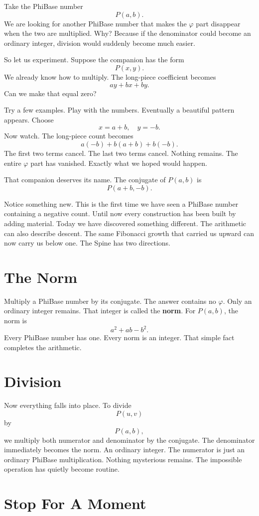 Take the PhiBase number
\[
P(a,b).
\]
We are looking for another PhiBase number that makes the \(\varphi\) part disappear when the two are multiplied. Why? Because if the denominator could become an ordinary integer, division would suddenly become much easier.

So let us experiment. Suppose the companion has the form
\[
P(x,y).
\]
We already know how to multiply. The long-piece coefficient becomes
\[
ay+bx+by.
\]
Can we make that equal zero?

Try a few examples. Play with the numbers. Eventually a beautiful pattern appears. Choose
\[
x=a+b, \quad y=-b.
\]
Now watch. The long-piece count becomes
\[
a(-b) + b(a+b) + b(-b).
\]
The first two terms cancel. The last two terms cancel. Nothing remains. The entire \(\varphi\) part has vanished. Exactly what we hoped would happen.

That companion deserves its name. The conjugate of \(P(a,b)\) is
\[
P(a+b,-b).
\]

Notice something new. This is the first time we have seen a PhiBase number containing a negative count. Until now every construction has been built by adding material. Today we have discovered something different. The arithmetic can also describe descent. The same Fibonacci growth that carried us upward can now carry us below one. The Spine has two directions.

\section*{The Norm}

Multiply a PhiBase number by its conjugate. The answer contains no \(\varphi\). Only an ordinary integer remains. That integer is called the \textbf{norm}. For \(P(a,b)\), the norm is
\[
a^2+ab-b^2.
\]
Every PhiBase number has one. Every norm is an integer. That simple fact completes the arithmetic.

\section*{Division}

Now everything falls into place. To divide
\[
P(u,v)
\]
by
\[
P(a,b),
\]
we multiply both numerator and denominator by the conjugate. The denominator immediately becomes the norm. An ordinary integer. The numerator is just an ordinary PhiBase multiplication. Nothing mysterious remains. The impossible operation has quietly become routine.

\section*{Stop For A Moment}

